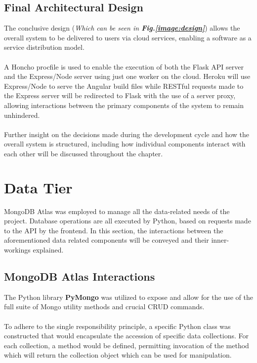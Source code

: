 \subsection{Final Architectural Design}
The conclusive design (\textit{Which can be seen in \textbf{Fig.\ref{image:design}}}) allows the overall system to be delivered to users via cloud services, enabling a software as a service distribution model. 

\paragraph{}
A Honcho procfile is used to enable the execution of both the Flask API server and the Express/Node server using just one worker on the cloud. Heroku will use Express/Node to serve the Angular build files while RESTful requests made to the Express server will be redirected to Flask with the use of a server proxy, allowing interactions between the primary components of the system to remain unhindered.

\paragraph{}
Further insight on the decisions made during the development cycle and how the overall system is structured, including how individual components interact with each other will be discussed throughout the chapter.\newline

\section{Data Tier}
MongoDB Atlas was employed to manage all the data-related needs of the project. Database operations are all executed by Python, based on requests made to the API by the frontend. In this section, the interactions between the aforementioned data related components will be conveyed and their inner-workings explained.

\subsection{MongoDB Atlas Interactions}
The Python library \textbf{PyMongo} was utilized to expose and allow for the use of the full suite of Mongo utility methods and crucial CRUD commands. 

\paragraph{}
To adhere to the single responsibility principle, a specific Python class was constructed that would encapsulate the accession of specific data collections. For each collection, a method would be defined, permitting invocation of the method which will return the collection object which can be used for manipulation. \newline

